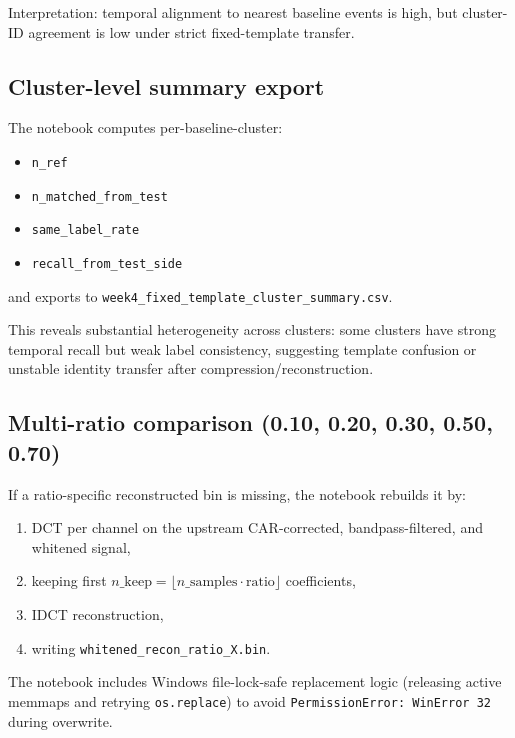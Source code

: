 ﻿\documentclass[11pt]{article}
\begin{document}
Interpretation: temporal alignment to nearest baseline events is high, but cluster-ID agreement is low under strict fixed-template transfer.

\subsection{Cluster-level summary export}
The notebook computes per-baseline-cluster:
\begin{itemize}
  \item \texttt{n\_ref}
  \item \texttt{n\_matched\_from\_test}
  \item \texttt{same\_label\_rate}
  \item \texttt{recall\_from\_test\_side}
\end{itemize}
and exports to \texttt{week4\_fixed\_template\_cluster\_summary.csv}.

This reveals substantial heterogeneity across clusters: some clusters have strong temporal recall but weak label consistency, suggesting template confusion or unstable identity transfer after compression/reconstruction.

\subsection{Multi-ratio comparison (0.10, 0.20, 0.30, 0.50, 0.70)}
If a ratio-specific reconstructed bin is missing, the notebook rebuilds it by:
\begin{enumerate}
  \item DCT per channel on the upstream CAR-corrected, bandpass-filtered, and whitened signal,
  \item keeping first $n\_\text{keep}=\lfloor n\_\text{samples}\cdot\text{ratio}\rfloor$ coefficients,
  \item IDCT reconstruction,
  \item writing \texttt{whitened\_recon\_ratio\_X.bin}.
\end{enumerate}

The notebook includes Windows file-lock-safe replacement logic (releasing active memmaps and retrying \texttt{os.replace}) to avoid \texttt{PermissionError: WinError 32} during overwrite.
\end{document}
